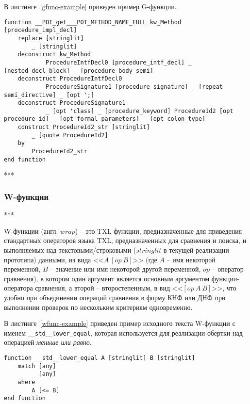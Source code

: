 В листинге~\ref{gfunc-example} приведен пример G-функции.

\begin{lstlisting}[frame=single, language=TXL, label={gfunc-example}, caption={Пример G-функции}]
function __POI_get___POI_METHOD_NAME_FULL kw_Method [procedure_impl_decl]
	replace [stringlit]
		_ [stringlit]
	deconstruct kw_Method
		    ProcedureIntfDecl0 [procedure_intf_decl] _ [nested_decl_block] _ [procedure_body_semi]
	deconstruct ProcedureIntfDecl0
		    ProcedureSignature1 [procedure_signature] _ [repeat semi_directive] _ [opt ';]
	deconstruct ProcedureSignature1
		    _ [opt 'class] _ [procedure_keyword] ProcedureId2 [opt procedure_id] _ [opt formal_parameters] _ [opt colon_type]
	construct ProcedureId2_str [stringlit]
		_ [quote ProcedureId2]
	by
		ProcedureId2_str
end function
\end{lstlisting}

***

\subsubsection{W-функции}

***

W-функции (англ. $wrap$) -- это TXL функции, предназначенные для приведения стандартных операторов языка TXL, предназначенных для сравнения и поиска, и выполняемых над текстовыми/строковыми ($stringlit$ в текущей реализации прототипа) данными, из вида <<$A~[op~B]$>> (где $A$ -- имя некоторой переменной, $B$ -- значение или имя некоторой другой переменной, $op$ -- оператор сравнения), в котором один аргумент является основным аргументом функции-оператора сравнения, а второй -- второстепенным, в вид <<$[op~A~B]$>>, что удобно при объединении операций сравнения в форму КНФ или ДНФ при выполнении проверок по нескольким критериям одновременно.

В листинге~\ref{wfunc-example} приведен пример исходного текста W-функции с именем \lstinline{__std__lower_equal}, которая используется для реализации обертки над операцией \textit{меньше или равно}.

\begin{lstlisting}[frame=single, language=TXL, label={wfunc-example}, caption={Пример W-функции}]
function __std__lower_equal A [stringlit] B [stringlit]
	match [any]
		_ [any]
	where
		A [<= B]
end function
\end{lstlisting}


